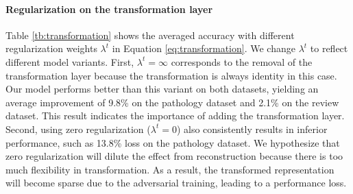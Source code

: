 



\paragraph{Regularization on the transformation layer} 
Table \ref{tb:transformation} shows the averaged accuracy with different regularization weights $\lambda^{t}$ in Equation \ref{eq:transformation}. We change  $\lambda^{t}$ to reflect different model variants. 
First, $\lambda^{t}=\infty$ corresponds to the removal of the transformation layer because the transformation is always identity in this case. Our model performs better than this variant on both datasets, yielding an average improvement of 9.8\% on the pathology dataset and 2.1\% on the review dataset. This result indicates the importance of adding the transformation layer. Second, using zero regularization ($\lambda^{t}=0$) also consistently results in inferior performance, such as 13.8\% loss on the pathology dataset. We hypothesize that zero regularization will dilute the effect from reconstruction because there is too much flexibility in transformation. As a result, the transformed representation will become sparse due to the adversarial training, leading to a performance loss.

